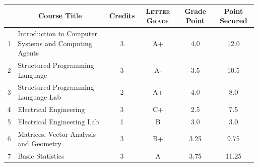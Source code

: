 \documentclass[11pt]{article}
\newcommand*{\numtwo}[1]{\pgfmathprintnumber[
                    fixed, precision=2, fixed zerofill=true]{#1}}
\begin{document}
                \begin{center}
                    \renewcommand{\arraystretch}{1.08}
                    
                \begin{tabular}{|c|l|c|>{\scshape}c|c|c|}
                \hline  \rule[-1ex]{0pt}{3.5ex} {\centering{\bf Course Code}} &  \multicolumn{1}{c|}{\textbf{Course Title}}  & {\bf Credits} & {\bf Letter Grade} & {\bf Grade Point} & {\bf Point Secured}  \\ 
                \hline   1 &  Introduction to Computer Systems and Computing Agents		 & 3 & A+ & 4.0 & 12.0 \\ %
                \hline   2 &  Structured Programming Language		 & 3 & A- & 3.5 & 10.5 \\ %
                \hline   3 &  Structured Programming Language Lab		 & 2 & A+ & 4.0 & 8.0 \\ %
                \hline   4 &  Electrical Engineering		 & 3 & C+ & 2.5 & 7.5 \\ %
                \hline   5 &  Electrical Engineering Lab		 & 1 & B & 3.0 & 3.0 \\ %
                \hline   6 &  Matrices, Vector Analysis and Geometry		 & 3 & B+ & 3.25 & 9.75 \\ %
                \hline   7 &  Basic Statistics		 & 3 & A & 3.75 & 11.25 \\ %

\hline                %
                \end{tabular}
                \end{center}
                \renewcommand{\arraystretch}{1.03}
\end{document}
